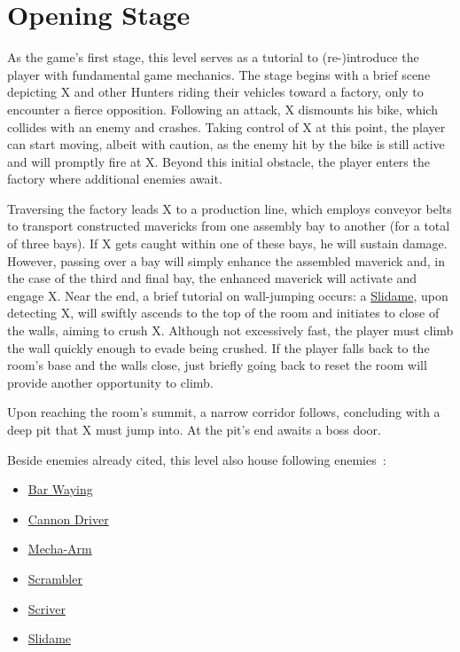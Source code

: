 \section{Opening Stage}
As the game's first stage, this level serves as a tutorial to (re-)introduce the player with fundamental game mechanics. The stage begins with a brief scene depicting X and other Hunters riding their vehicles toward a factory, only to encounter a fierce opposition. Following an attack, X dismounts his bike, which collides with an enemy and crashes. Taking control of X at this point, the player can start moving, albeit with caution, as the enemy hit by the bike is still active and will promptly fire at X. Beyond this initial obstacle, the player enters the factory where additional enemies await.

Traversing the factory leads X to a production line, which employs conveyor belts to transport constructed mavericks from one assembly bay to another (for a total of three bays). If X gets caught within one of these bays, he will sustain damage. However, passing over a bay will simply enhance the assembled maverick and, in the case of the third and final bay, the enhanced maverick will activate and engage X. Near the end, a brief tutorial on wall-jumping occurs: a \hyperlink{enem:Slidame}{Slidame}, upon detecting X, will swiftly ascends to the top of the room and initiates to close of the walls, aiming to crush X. Although not excessively fast, the player must climb the wall quickly enough to evade being crushed. If the player falls back to the room's base and the walls close, just briefly going back to reset the room  will provide another opportunity to climb.

Upon reaching the room's summit, a narrow corridor follows, concluding with a deep pit that X must jump into. At the pit's end awaits a boss door.

Beside enemies already cited, this level also house following enemies~\cite{wiki:X2_opening}:
\begin{itemize}
	\item \hyperlink{enem:Bar_Waying}{Bar Waying}
	\item \hyperlink{enem:Cannon_Driver}{Cannon Driver}
	\item \hyperlink{enem:Mecha-Arm}{Mecha-Arm}
	\item \hyperlink{enem:Scrambler}{Scrambler}
	\item \hyperlink{enem:Scriver}{Scriver}
	\item \hyperlink{enem:Slidame}{Slidame}
\end{itemize}

